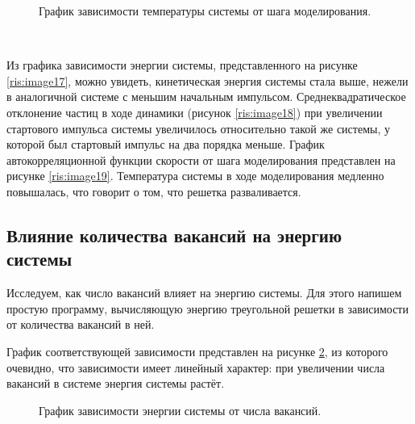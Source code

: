 \documentclass[14pt,a4paper,report]{ncc}
\begin{document}
\begin{figure}[h!]
\caption{График зависимости температуры системы от шага моделирования.}
\label{ris:image20}
\end{figure}
\

Из графика зависимости энергии системы, представленного на рисунке \ref{ris:image17}, можно увидеть, кинетическая энергия системы стала выше, нежели в аналогичной системе с меньшим начальным импульсом. Среднеквадратическое отклонение частиц в ходе динамики (рисунок \ref{ris:image18}) при увеличении стартового импульса системы увеличилось относительно такой же системы, у которой был стартовый импульс на два порядка меньше. График автокорреляционной функции скорости от шага моделирования представлен на рисунке \ref{ris:image19}. Температура системы в ходе моделирования медленно повышалась, что говорит о том, что решетка разваливается.
\
\newpage
\subsection{Влияние количества вакансий на энергию системы}
Исследуем, как число вакансий влияет на энергию системы. Для этого напишем простую программу, вычисляющую энергию треугольной решетки в зависимости от количества вакансий в ней.
\

График соответствующей зависимости представлен на рисунке \ref{ris:image21}, из которого очевидно, что зависимости имеет линейный характер: при увеличении числа вакансий в системе энергия системы растёт.
\begin{figure}[h!]
\caption{График зависимости энергии системы от числа вакансий.}
\label{ris:image21}
\end{figure}
\newpage
\end{document}

